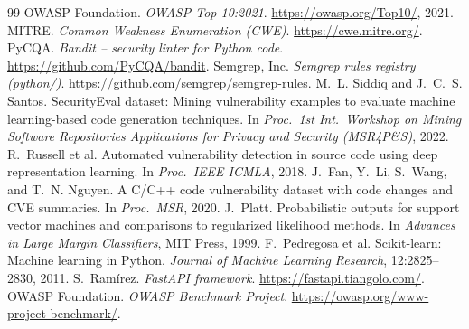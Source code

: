 \documentclass[11pt,a4paper,twoside]{report}
\begin{document}
\begin{thebibliography}{99}
 OWASP Foundation. \emph{OWASP Top 10:2021}. \url{https://owasp.org/Top10/}, 2021.
 MITRE. \emph{Common Weakness Enumeration (CWE)}. \url{https://cwe.mitre.org/}.
 PyCQA. \emph{Bandit -- security linter for Python code}. \url{https://github.com/PyCQA/bandit}.
 Semgrep, Inc. \emph{Semgrep rules registry (python/)}. \url{https://github.com/semgrep/semgrep-rules}.
 M.~L. Siddiq and J.~C.~S. Santos. SecurityEval dataset: Mining vulnerability examples to evaluate machine learning-based code generation techniques. In \emph{Proc.\ 1st Int.\ Workshop on Mining Software Repositories Applications for Privacy and Security (MSR4P\&S)}, 2022.
 R.~Russell et al. Automated vulnerability detection in source code using deep representation learning. In \emph{Proc.\ IEEE ICMLA}, 2018.
 J.~Fan, Y.~Li, S.~Wang, and T.~N. Nguyen. A C/C++ code vulnerability dataset with code changes and CVE summaries. In \emph{Proc.\ MSR}, 2020.
 J.~Platt. Probabilistic outputs for support vector machines and comparisons to regularized likelihood methods. In \emph{Advances in Large Margin Classifiers}, MIT Press, 1999.
 F.~Pedregosa et al. Scikit-learn: Machine learning in Python. \emph{Journal of Machine Learning Research}, 12:2825--2830, 2011.
 S.~Ram\'irez. \emph{FastAPI framework}. \url{https://fastapi.tiangolo.com/}.
 OWASP Foundation. \emph{OWASP Benchmark Project}. \url{https://owasp.org/www-project-benchmark/}.
\end{thebibliography}
\end{document}
